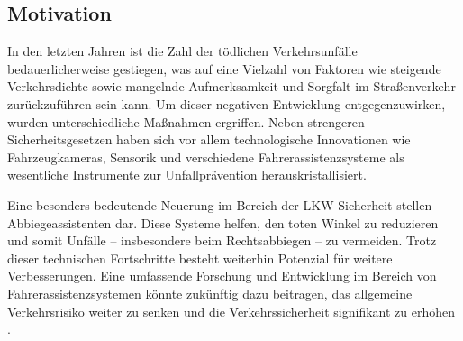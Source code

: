\documentclass[a4paper, 12pt]{article} %
\begin{document}
    \subsection{Motivation}
\begin{spacing}{1.8}  %
    \fontsize{14pt}{15pt}\selectfont  %

    In den letzten Jahren ist die Zahl der tödlichen Verkehrsunfälle bedauerlicherweise
     gestiegen, was auf eine Vielzahl von Faktoren wie steigende
      Verkehrsdichte sowie mangelnde Aufmerksamkeit und Sorgfalt
       im Straßenverkehr zurückzuführen sein kann. Um dieser
        negativen Entwicklung entgegenzuwirken,
         wurden unterschiedliche Maßnahmen ergriffen. 
         Neben strengeren Sicherheitsgesetzen haben sich vor 
         allem technologische Innovationen wie Fahrzeugkameras, Sensorik und verschiedene Fahrerassistenzsysteme als wesentliche
          Instrumente zur Unfallprävention herauskristallisiert.

        

Eine besonders bedeutende Neuerung im Bereich 
der LKW-Sicherheit stellen Abbiegeassistenten dar.
 Diese Systeme helfen, den toten Winkel zu reduzieren und somit
  Unfälle – insbesondere beim Rechtsabbiegen – zu vermeiden. Trotz dieser technischen Fortschritte besteht 
  weiterhin Potenzial für weitere Verbesserungen. Eine umfassende Forschung und Entwicklung im Bereich von Fahrerassistenzsystemen könnte zukünftig dazu beitragen, 
  das allgemeine Verkehrsrisiko weiter zu senken und die Verkehrssicherheit signifikant zu erhöhen \cite{grunder_simon_2024}.
\end{spacing}

\clearpage
\end{document}
